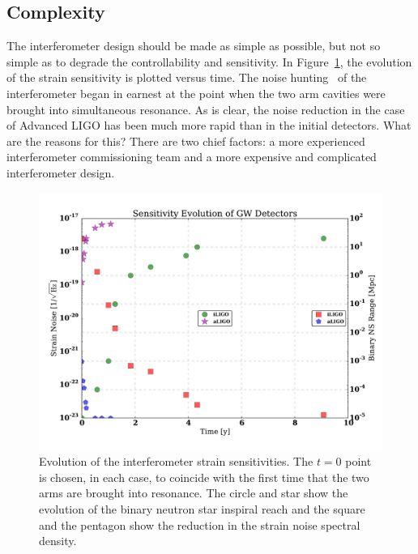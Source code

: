 \subsection{Complexity}
\label{s:IDC:Complex}
The interferometer design should be made as simple as possible, but not so simple as to degrade the controllability and sensitivity.
In
Figure~\ref{fig:IDC:SensEvo}, the evolution of the strain sensitivity is plotted
versus time. The noise hunting~\cite{Rana:PhD} of the interferometer began in earnest at the
point when the two arm cavities were brought into simultaneous resonance. As is
clear, the noise reduction in the case of Advanced LIGO has been much more rapid
than in the initial detectors. What are the reasons for this? There are two chief
factors: a more experienced interferometer commissioning team and a more expensive
and complicated interferometer design.

\begin{figure}[h]
\centering
\includegraphics[width=\columnwidth]{Figures/NoiseProgComp.pdf}
\caption{Evolution of the interferometer strain sensitivities. The $t = 0$
  point is chosen, in each case, to coincide with the first time that the
  two arms are brought into resonance. The circle and star show the evolution of
  the binary neutron star inspiral reach and the square and the pentagon show
  the reduction in the strain noise spectral density.}
\label{fig:IDC:SensEvo}
\end{figure}

